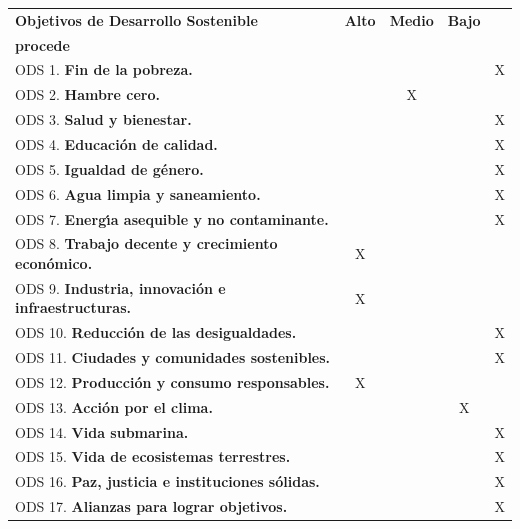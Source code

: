 \documentclass[11pt,spanish,listoffigures,listoftables]{tfgetsinf}
\begin{document}
\begin{tabularx}{\textwidth}{|>{\raggedright\arraybackslash}X|c|c|c|c|}\hline
   \textbf{Objetivos de Desarrollo Sostenible} & \textbf{Alto} & \textbf{Medio} & \textbf{Bajo} & \begin{tabular}[c]{@{}c@{}}\textbf{No}\\\textbf{procede}\end{tabular} \\ \hline
   ODS 1.  \textbf{Fin de la pobreza.}                            & & & & X \\ \hline
   ODS 2.  \textbf{Hambre cero.}                                  & & X & & \\ \hline
   ODS 3.  \textbf{Salud y bienestar.}                            & & & & X\\ \hline
   ODS 4.  \textbf{Educaci\'on de calidad.}                       & & & & X \\ \hline
   ODS 5.  \textbf{Igualdad de g\'enero.}                         & & & & X \\ \hline
   ODS 6.  \textbf{Agua limpia y saneamiento.}                    & & & & X \\ \hline
   ODS 7.  \textbf{Energ\'{\i}a asequible y no contaminante.}     & & & & X\\ \hline
   ODS 8.  \textbf{Trabajo decente y crecimiento econ\'omico.}    & X & & & \\ \hline
   ODS 9.  \textbf{Industria, innovaci\'on e infraestructuras.}   & X & & & \\ \hline
   ODS 10. \textbf{Reducci\'on de las desigualdades.}             & & & & X\\ \hline
   ODS 11. \textbf{Ciudades y comunidades sostenibles.}           & & & & X\\ \hline
   ODS 12. \textbf{Producci\'on y consumo responsables.}          & X & & & \\ \hline
   ODS 13. \textbf{Acci\'on por el clima.}                        & & & X & \\ \hline
   ODS 14. \textbf{Vida submarina.}                               & & & & X \\ \hline
   ODS 15. \textbf{Vida de ecosistemas terrestres.}               & & & & X\\ \hline
   ODS 16. \textbf{Paz, justicia e instituciones s\'olidas.}      & & & & X\\ \hline
   ODS 17. \textbf{Alianzas para lograr objetivos.}               & & & & X\\ \hline
   \end{tabularx}
\end{document}
